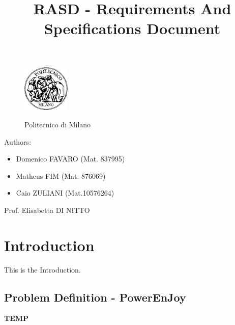 \documentclass[a4paper]{article}
\title{RASD - Requirements And Specifications Document}
\begin{document}
\begin{titlepage}
\begin{figure}
\centering
\includegraphics[width=0.2\textwidth]{polimi.jpg}
\par
\LARGE Politecnico di Milano
\end{figure}


\maketitle
\raggedright
Authors:
\begin{itemize}
	\item Domenico FAVARO (Mat. 837995)
        	\item Matheus FIM (Mat. 876069)
	\item Caio ZULIANI (Mat.10576264)	
\end{itemize}
\raggedleft
Prof. Elisabetta DI NITTO
\thispagestyle{empty}
\end{titlepage}

\tableofcontents
\newpage
 
\section{Introduction}
 
This is the Introduction.
\subsection{Problem Definition - PowerEnJoy}

\textbf{TEMP}
\end{document}
